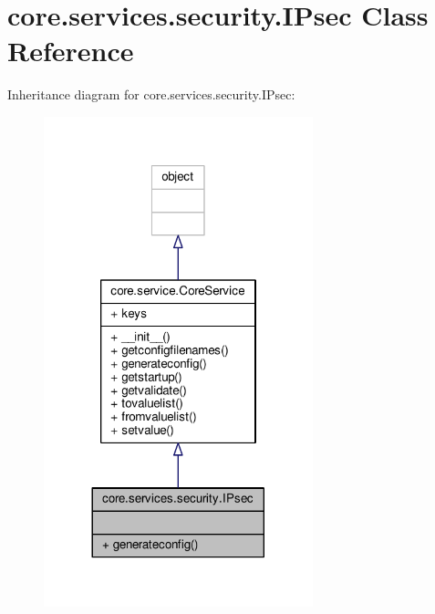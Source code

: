 \hypertarget{classcore_1_1services_1_1security_1_1_i_psec}{\section{core.\+services.\+security.\+I\+Psec Class Reference}
\label{classcore_1_1services_1_1security_1_1_i_psec}
}


Inheritance diagram for core.\+services.\+security.\+I\+Psec\+:
\nopagebreak
\begin{figure}[H]
\begin{center}
\leavevmode
\includegraphics[width=221pt]{classcore_1_1services_1_1security_1_1_i_psec__inherit__graph}
\end{center}
\end{figure}


